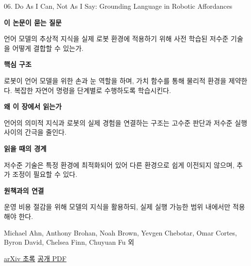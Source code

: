 \documentclass[11pt,openany]{book}
\begin{document}
\begin{termcard}{06. Do As I Can, Not As I Say: Grounding Language in Robotic Affordances}

\par

\medskip

{\sffamily\bfseries\color{deepblue} 이 논문이 묻는 질문}\par

언어 모델의 추상적 지식을 실제 로봇 환경에 적용하기 위해 사전 학습된 저수준 기술을 어떻게 결합할 수 있는가.

\smallskip

{\sffamily\bfseries\color{deepblue} 핵심 구조}\par

로봇이 언어 모델을 위한 손과 눈 역할을 하며, 가치 함수를 통해 물리적 환경을 제약한다. 복잡한 자연어 명령을 단계별로 수행하도록 학습시킨다.

\smallskip

{\sffamily\bfseries\color{deepblue} 왜 이 장에서 읽는가}\par

언어의 의미적 지식과 로봇의 실제 경험을 연결하는 구조는 고수준 판단과 저수준 실행 사이의 간극을 줄인다.

\smallskip

{\sffamily\bfseries\color{coral} 읽을 때의 경계}\par

저수준 기술은 특정 환경에 최적화되어 있어 다른 환경으로 쉽게 이전되지 않으며, 추가 조정이 필요할 수 있다.

\smallskip

{\sffamily\bfseries\color{teal} 원책과의 연결}\par

운영 비용 절감을 위해 모델의 지식을 활용하되, 실제 실행 가능한 범위 내에서만 적용해야 한다.

\medskip

{\footnotesize\color{muted} Michael Ahn, Anthony Brohan, Noah Brown, Yevgen Chebotar, Omar Cortes, Byron David, Chelsea Finn, Chuyuan Fu 외\par

\href{https://arxiv.org/abs/2204.01691}{arXiv 초록} \quad \href{https://arxiv.org/pdf/2204.01691}{공개 PDF}\par}

\end{termcard}
\end{document}

